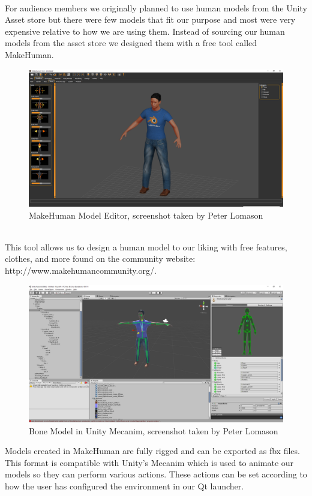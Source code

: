 \documentclass[a4paper,10pt]{article}
\begin{document}
\par~\\
For audience members we originally planned to use human models from the Unity Asset store but there were few models that fit our purpose and most were very expensive relative to how we are using them. Instead of sourcing our human models from the asset store we designed them with a free tool called MakeHuman. 
\begin{figure}[H] %
	\centerline {\includegraphics[scale = 0.28]{makeHuman.png}}
	\caption{MakeHuman Model Editor, screenshot taken by Peter Lomason}
	\label{fig:makeHuman}
\end{figure}
\par~\\
This tool allows us to design a human model to our liking with free features, clothes, and more found on the community website: http://www.makehumancommunity.org/.
\par
\begin{figure}[H] %
	\centerline {\includegraphics[scale = 0.28]{unityMecanim.png}}
	\caption{Bone Model in Unity Mecanim, screenshot taken by Peter Lomason}
	\label{fig:unityMecanim}
\end{figure}
Models created in MakeHuman are fully rigged and can be exported as fbx files. This format is compatible with Unity's Mecanim which is used to animate our models so they can perform various actions. These actions can be set according to how the user has configured the environment in our Qt launcher.
\end{document}

